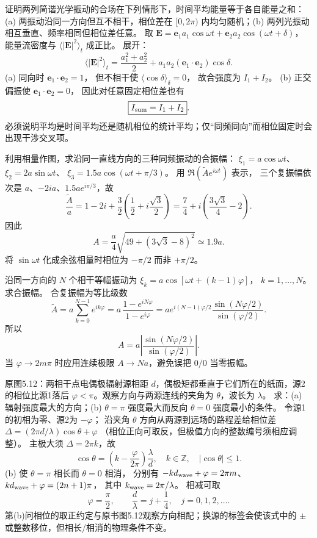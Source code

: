 证明两列简谐光学振动的合场在下列情形下，时间平均能量等于各自能量之和：(a) 两振动沿同一方向但互不相干，相位差在 $[0,2\pi)$ 内均匀随机；(b) 两列光振动相互垂直、频率相同但相位差任意。
\exsolution
取
$\bm E=\bm e_1a_1\cos\omega t+\bm e_2a_2\cos(\omega t+\delta)$，
能量流密度与 $\langle|\bm E|^2\rangle_t$ 成正比。
展开：
\[
\langle|\bm E|^2\rangle_t
=\frac{a_1^2+a_2^2}{2}
+a_1a_2(\bm e_1\cdot\bm e_2)\cos\delta .
\]
(a) 同向时 $\bm e_1\cdot\bm e_2=1$，
但不相干使 $\langle\cos\delta\rangle_\delta=0$，
故合强度为 $I_1+I_2$。
(b) 正交偏振使 $\bm e_1\cdot\bm e_2=0$，
因此对任意固定相位差也有
\[
\boxed{I_{\rm sum}=I_1+I_2}.
\]
\excheck 必须说明平均是时间平均还是随机相位的统计平均；仅“同频同向”而相位固定时会出现干涉交叉项。

利用相量作图，求沿同一直线方向的三种同频振动的合振幅：
$\xi_1=a\cos\omega t$、
$\xi_2=2a\sin\omega t$、
$\xi_3=1.5a\cos(\omega t+\pi/3)$。
\exsolution
用 $\Re(\widetilde A e^{i\omega t})$ 表示，
三个复振幅依次是
$a$、$-2ia$、$1.5a e^{i\pi/3}$，故
\[
\frac{\widetilde A}{a}
=1-2i+\frac32\left(\frac12+i\frac{\sqrt3}{2}\right)
=\frac74+i\left(\frac{3\sqrt3}4-2\right).
\]
因此
\[
\boxed{A=\frac a4\sqrt{49+(3\sqrt3-8)^2}
\simeq1.9a}.
\]
\excheck 将 $\sin\omega t$ 化成余弦相量时相位为 $-\pi/2$ 而非 $+\pi/2$。

沿同一方向的 $N$ 个相干等幅振动为
$\xi_k=a\cos[\omega t+(k-1)\varphi]$，
$k=1,\ldots,N$。
求合振幅。
\exsolution
合复振幅为等比级数
\[
\widetilde A=a\sum_{k=0}^{N-1}e^{ik\varphi}
=a\,\frac{1-e^{iN\varphi}}{1-e^{i\varphi}}
=ae^{i(N-1)\varphi/2}
\frac{\sin(N\varphi/2)}{\sin(\varphi/2)}.
\]
所以
\[
\boxed{A=a\left|
\frac{\sin(N\varphi/2)}{\sin(\varphi/2)}
\right|}.
\]
\excheck 当 $\varphi\to 2m\pi$ 时应用连续极限
$A\to Na$，避免误把 $0/0$ 当零振幅。

原图5.12：两相干点电偶极辐射源相距 $d$，偶极矩都垂直于它们所在的纸面，源2的相位比源1落后 $\varphi<\pi$。观察方向与两源连线的夹角为 $\theta$，波长为 $\lambda$。
求：(a) 辐射强度最大的方向；(b) $\theta=\pi$ 强度最大而反向 $\theta=0$ 强度最小的条件。
\exsolution
令源1的初相为零、源2为 $-\varphi$；
沿夹角 $\theta$ 方向从两源到远场的路程差给相位差
$\Delta=(2\pi d/\lambda)\cos\theta+\varphi$
（相位正向可取反，但极值方向的整数编号须相应调整）。
主极大须 $\Delta=2\pi k$，故
\[
\boxed{\cos\theta=
\left(k-\frac{\varphi}{2\pi}\right)\frac{\lambda}{d}},
\quad k\in\mathbb Z,\quad|\cos\theta|\le1.
\]
(b) 使 $\theta=\pi$ 相长而 $\theta=0$ 相消，
分别有
$-kd_{\rm wave}+\varphi=2\pi m$、
$kd_{\rm wave}+\varphi=(2n+1)\pi$，
其中 $k_{\rm wave}=2\pi/\lambda$。
相减可取
\[
\boxed{\varphi=\frac\pi2,\qquad
\frac d\lambda=j+\frac14},\quad j=0,1,2,\ldots.
\]
\excheck 第(b)问相位的取正约定与原书图5.12观察方向相配；换源的标签会使该式中的 $\pm$ 或整数移位，但相长/相消的物理条件不变。


